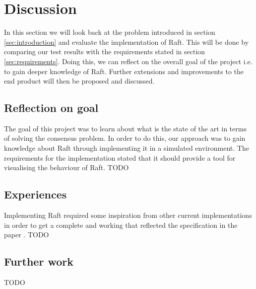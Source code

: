 \section{Discussion} %
\label{sec:discussion}
In this section we will look back at the problem introduced in section \ref{sec:introduction} and evaluate the implementation of Raft. This will be done by comparing our test results with the requirements stated in section \ref{sec:requirements}. Doing this, we can reflect on the overall goal of the project i.e. to gain deeper knowledge of Raft. Further extensions and improvements to the end product will then be proposed and discussed.

\subsection{Reflection on goal}
The goal of this project was to learn about what is the state of the art in terms of solving the consensus problem. In order to do this, our approach was to gain knowledge about Raft through implementing it in a simulated environment. The requirements for the implementation stated that it should provide a tool for visualising the behaviour of Raft. TODO

\subsection{Experiences}
Implementing Raft required some inspiration from other current implementations in order to get a complete and working that reflected the specification in the paper \cite{Raft}. TODO
\subsection{Further work}
TODO



